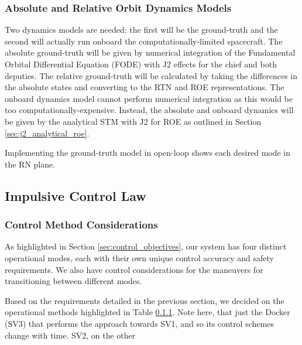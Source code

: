 \subsubsection{Absolute and Relative Orbit Dynamics Models}
Two dynamics models are needed: the first will be the ground-truth and the second will actually run onboard the computationally-limited spacecraft. The absolute ground-truth will be given by numerical integration of the Fundamental Orbital Differential Equation (FODE) with J2 effects for the chief and both deputies. The relative ground-truth will be calculated by taking the differences in the absolute states and converting to the RTN and ROE representations. The onboard dynamics model cannot perform numerical integration as this would be too computationally-expensive. Instead, the absolute and onboard dynamics will be given by the analytical STM with J2 for ROE as outlined in Section \ref{sec:j2_analytical_roe}.  

Implementing the ground-truth model in open-loop shows each desired mode in the RN plane. 



\subsection{Impulsive Control Law}

\subsubsection{Control Method Considerations}

As highlighted in Section \ref{sec:control_objectives}, our system has four distinct operational modes, each with their own unique control accuracy and safety requirements. We also have control considerations for the maneuvers for transitioning between different modes.

Based on the requirements detailed in the previous section, we decided on the operational methods highlighted in Table \ref{}. Note here, that just the Docker (SV3) that performs the approach towards SV1, and so its control schemes change with time. SV2, on the other 






